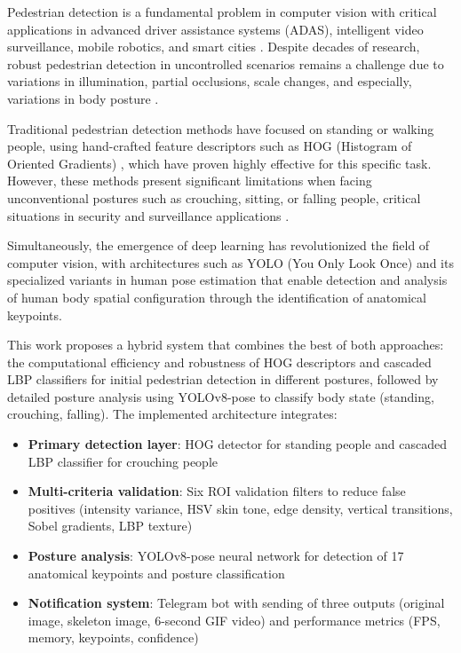 \documentclass[conference]{IEEEtran}
\begin{document}
Pedestrian detection is a fundamental problem in computer vision with critical applications in advanced driver assistance systems (ADAS), intelligent video surveillance, mobile robotics, and smart cities \cite{dalal2005histograms, dollar2012pedestrian}. Despite decades of research, robust pedestrian detection in uncontrolled scenarios remains a challenge due to variations in illumination, partial occlusions, scale changes, and especially, variations in body posture \cite{zhang2016far, benenson2014ten}.

Traditional pedestrian detection methods have focused on standing or walking people, using hand-crafted feature descriptors such as HOG (Histogram of Oriented Gradients) \cite{dalal2005histograms}, which have proven highly effective for this specific task. However, these methods present significant limitations when facing unconventional postures such as crouching, sitting, or falling people, critical situations in security and surveillance applications \cite{enzweiler2009monocular}.

Simultaneously, the emergence of deep learning has revolutionized the field of computer vision, with architectures such as YOLO (You Only Look Once) \cite{redmon2016you, redmon2017yolo9000} and its specialized variants in human pose estimation \cite{toshev2014deeppose, cao2017realtime} that enable detection and analysis of human body spatial configuration through the identification of anatomical keypoints.

This work proposes a hybrid system that combines the best of both approaches: the computational efficiency and robustness of HOG descriptors and cascaded LBP classifiers for initial pedestrian detection in different postures, followed by detailed posture analysis using YOLOv8-pose \cite{ultralytics2023yolov8} to classify body state (standing, crouching, falling). The implemented architecture integrates:

\begin{itemize}
    \item \textbf{Primary detection layer}: HOG detector for standing people and cascaded LBP classifier for crouching people
    \item \textbf{Multi-criteria validation}: Six ROI validation filters to reduce false positives (intensity variance, HSV skin tone, edge density, vertical transitions, Sobel gradients, LBP texture)
    \item \textbf{Posture analysis}: YOLOv8-pose neural network for detection of 17 anatomical keypoints and posture classification
    \item \textbf{Notification system}: Telegram bot with sending of three outputs (original image, skeleton image, 6-second GIF video) and performance metrics (FPS, memory, keypoints, confidence)
\end{itemize}
\end{document}

